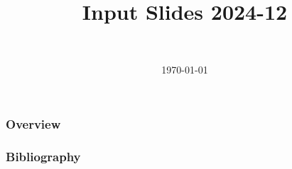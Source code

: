 \documentclass[]{beamer}
\title[Input Slides 2024-12]{Input Slides 2024-12}
\author[Daniel Topa]{\TopaHII \\ \TopaHIIEmail}
\institute{\missiontech}
\date{\today}
\begin{document}
\begin{frame}
	\titlepage
\end{frame}

\begin{frame}\frametitle{Overview}
	\tableofcontents[hideallsubsections]
\end{frame}

	
	
	

{\tiny{
\begin{frame}[allowframebreaks]\frametitle{Bibliography}
	\nocite{*}
	\printbibliography
\end{frame}}}

\begin{frame}
	\titlepage
\end{frame}
\end{document}
